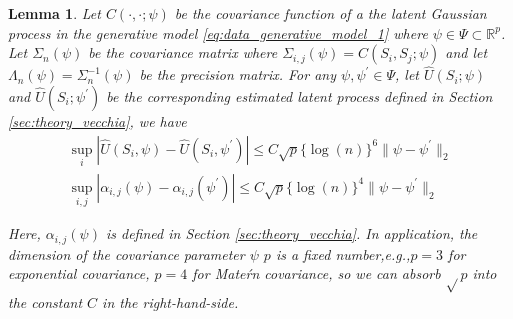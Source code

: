 \documentclass[12pt]{article}
\newtheorem{lemma}{Lemma}%
\newcommand{\R}{\mathbb{R}}
\begin{document}
\begin{lemma}\label{lemma:U_i_diff_psi}
Let $C(\cdot,\cdot;\psi)$ be the covariance function of a the latent Gaussian process in the generative model \eqref{eq:data_generative_model_1} where $\psi\in\Psi\subset\R^p$. Let $\Sigma_n(\psi)$ be the covariance matrix where $\Sigma_{i,j}(\psi) = C(S_i,S_j;\psi)$ and let $\Lambda_n(\psi) = \Sigma_n^{-1}(\psi)$ be the precision matrix. For any $\psi,\psi^\prime\in \Psi$, let $\widehat U(S_i;\psi)$ and $\widehat U(S_i;\psi^\prime)$ be the corresponding estimated latent process defined in Section \eqref{sec:theory_vecchia}, we have
\begin{gather*}
\sup_{i}\left|\widehat U(S_i,\psi)-\widehat U(S_i,\psi^\prime)\right|\leq C\sqrt{p}\{\log(n)\}^6\|\psi - \psi^\prime\|_2\\
\sup_{i,j}|\alpha_{i,j}(\psi)-\alpha_{i,j}(\psi^\prime)| \leq C\sqrt{p}\{\log(n)\}^4\|\psi - \psi^\prime\|_2
\end{gather*}

Here, $\alpha_{i,j}(\psi)$ is defined in Section \ref{sec:theory_vecchia}. In application, the dimension of the covariance parameter $\psi$ $p$ is a fixed number,e.g.,$p=3$ for exponential covariance, $p=4$ for Mate\'rn covariance, so we can absorb $\sqrt{}p$ into the constant $C$ in the right-hand-side.
\end{lemma}
\end{document}
